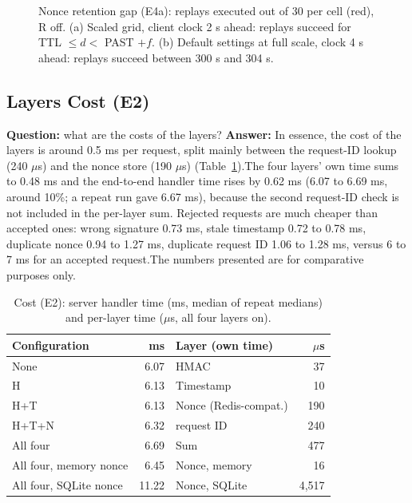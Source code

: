 \documentclass[conference]{IEEEtran}
\begin{document}
\begin{figure}[!t]
\caption{Nonce retention gap (E4a): replays executed out of 30 per cell (red), R off. (a) Scaled grid, client clock 2 s ahead: replays succeed for TTL $\le d <$ PAST $+ f$. (b) Default settings at full scale, clock 4 s ahead: replays succeed between 300 s and 304 s.}
\label{fig:gap}
\end{figure}

\subsection{Layers Cost (E2)}
\textbf{Question:} what are the costs of the layers? \textbf{Answer:} In essence, the cost of the layers is around 0.5 ms per request, split mainly between the request-ID lookup (240 $\mu$s) and the nonce store (190 $\mu$s) (Table~\ref{tab:cost}).The four layers' own time sums to 0.48 ms and the end-to-end handler time rises by 0.62 ms (6.07 to 6.69 ms, around 10\%; a repeat run gave 6.67 ms), because the second request-ID check is not included in the per-layer sum. Rejected requests are much cheaper than accepted ones: wrong signature 0.73 ms, stale timestamp 0.72 to 0.78 ms, duplicate nonce 0.94 to 1.27 ms, duplicate request ID 1.06 to 1.28 ms, versus 6 to 7 ms for an accepted request.The numbers presented are for comparative purposes only.



\begin{table}[!t]
\caption{Cost (E2): server handler time (ms, median of repeat medians) and per-layer time ($\mu$s, all four layers on).}
\label{tab:cost}
\centering
\footnotesize
\setlength{\tabcolsep}{4pt}
\begin{tabular}{@{}lrlr@{}}
\toprule
Configuration & ms & Layer (own time) & $\mu$s \\
\midrule
None & 6.07 & HMAC & 37 \\
H & 6.13 & Timestamp & 10 \\
H+T & 6.13 & Nonce (Redis-compat.) & 190 \\
H+T+N & 6.32 & request ID & 240 \\
All four & 6.69 & Sum & 477 \\
All four, memory nonce & 6.45 & Nonce, memory & 16 \\
All four, SQLite nonce & 11.22 & Nonce, SQLite & 4,517 \\
\bottomrule
\end{tabular}
\end{table}
\end{document}
